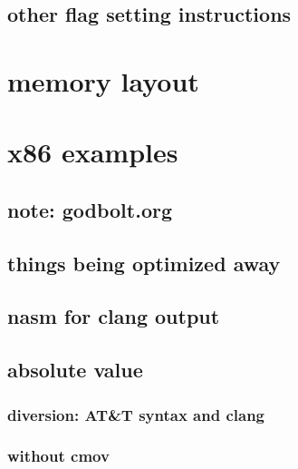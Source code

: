 \subsection{other flag setting instructions}



\section{memory layout}




\section{x86 examples}

\subsection{note: godbolt.org}



\subsection{things being optimized away}



\subsection{nasm for clang output}



\subsection{absolute value}





\subsubsection{diversion: AT\&T syntax and clang}





\subsubsection{without cmov}

